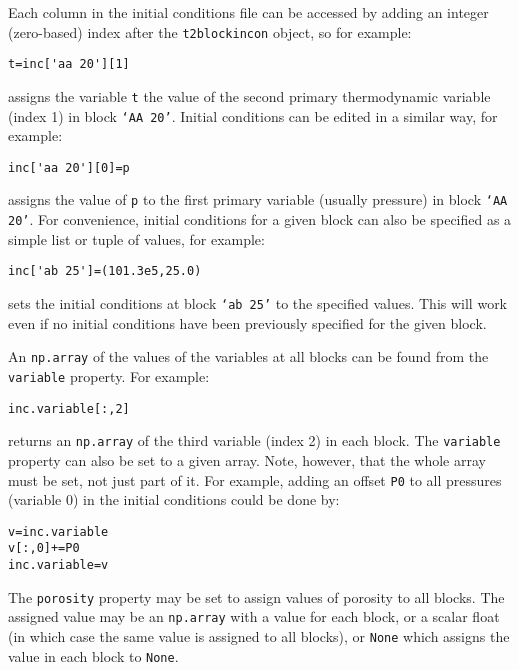 Each column in the initial conditions file can be accessed by adding an integer (zero-based) index after the \texttt{t2blockincon} object, so for example:

\begin{verbatim}
t=inc['aa 20'][1]
\end{verbatim}

assigns the variable \texttt{t} the value of the second primary thermodynamic variable (index 1) in block \texttt{`AA 20'}.  Initial conditions can be edited in a similar way, for example:

\begin{verbatim}
inc['aa 20'][0]=p
\end{verbatim}

assigns the value of \texttt{p} to the first primary variable (usually pressure) in block \texttt{`AA 20'}.  For convenience, initial conditions for a given block can also be specified as a simple list or tuple of values, for example:

\begin{verbatim}
inc['ab 25']=(101.3e5,25.0)
\end{verbatim}

sets the initial conditions at block \texttt{`ab 25'} to the specified values.  This will work even if no initial conditions have been previously specified for the given block.

An \texttt{np.array} of the values of the variables at all blocks can be found from the \texttt{variable} property.  For example:

\begin{verbatim}
inc.variable[:,2]
\end{verbatim}

returns an \texttt{np.array} of the third variable (index 2) in each block.  The \texttt{variable} property can also be set to a given array.  Note, however, that the whole array must be set, not just part of it.  For example, adding an offset \texttt{P0} to all pressures (variable 0) in the initial conditions could be done by:

\begin{verbatim}
v=inc.variable
v[:,0]+=P0
inc.variable=v
\end{verbatim}

The \texttt{porosity} property may be set to assign values of porosity to all blocks.  The assigned value may be an \texttt{np.array} with a value for each block, or a scalar float (in which case the same value is assigned to all blocks), or \texttt{None} which assigns the value in each block to \texttt{None}.

